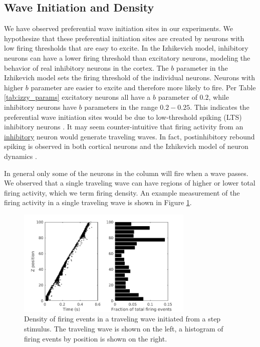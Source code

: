 \documentclass[a4paper,11pt]{article}
\begin{document}
\FloatBarrier


\subsection{Wave Initiation and Density} \label{sub:wave_initiation}
We have observed preferential wave initiation sites in our experiments.
We hypothesize that these preferential initiation sites are created by neurons with low firing thresholds that are easy to excite.
In the Izhikevich model, inhibitory neurons can have a lower firing threshold than excitatory neurons, modeling the behavior of real inhibitory neurons in the cortex\cite{gibson2009}.
The $b$ parameter in the Izhikevich model sets the firing threshold of the individual neurons.
Neurons with higher $b$ parameter are easier to excite and therefore more likely to fire.
Per Table \ref{tab:izzy_params} excitatory neurons all have a $b$ parameter of $0.2$, while inhibitory neurons have $b$ parameters in the range $0.2-0.25$.
This indicates the preferential wave initiation sites would be due to low-threshold spiking (LTS) inhibitory neurons \cite{izhikevich2003}.
It may seem counter-intuitive that firing activity from an \underline{inhibitory} neuron would generate traveling waves.
In fact, postinhibitory rebound spiking is observed in both cortical neurons \cite{ascoli2010} and the Izhikevich model of neuron dynamics \cite{izhikevich}.

In general only some of the neurons in the column will fire when a wave passes.
We observed that a single traveling wave can have regions of higher or lower total firing activity, which we term firing density.
An example measurement of the firing activity in a single traveling wave is shown in Figure \ref{fig:wave_density}.
\begin{figure}[!htb]
 \caption{Density of firing events in a traveling wave initiated from a step stimulus. The traveling wave is shown on the left, a histogram of firing events by position is shown on the right.}
 \label{fig:wave_density}
 \centering
   \includegraphics[width=0.75\textwidth]{fig/ImpulseWaveDensity}
\end{figure}
\end{document}
